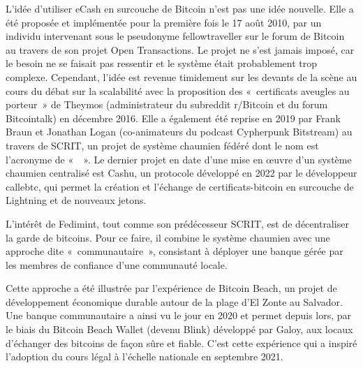 L'idée d'utiliser eCash en surcouche de Bitcoin n'est pas une idée nouvelle. Elle a été proposée et implémentée pour la première fois le 17 août 2010, par un individu intervenant sous le pseudonyme fellowtraveller sur le forum de Bitcoin au travers de son projet Open Transactions. Le projet ne s'est jamais imposé, car le besoin ne se faisait pas ressentir et le système était probablement trop complexe. Cependant, l'idée est revenue timidement sur les devants de la scène au cours du débat sur la scalabilité avec la proposition des «~certificats aveugles au porteur~» de Theymos (administrateur du subreddit r/Bitcoin et du forum Bitcointalk) en décembre 2016. Elle a également été reprise en 2019 par Frank Braun et Jonathan Logan (co-animateurs du podcast Cypherpunk Bitstream) au travers de SCRIT, un projet de système chaumien fédéré dont le nom est l'acronyme de «~~». Le dernier projet en date d'une mise en œuvre d'un système chaumien centralisé est Cashu, un protocole développé en 2022 par le développeur callebtc, qui permet la création et l'échange de certificats-bitcoin en surcouche de Lightning et de nouveaux jetons.


L'intérêt de Fedimint, tout comme son prédécesseur SCRIT, est de décentraliser la garde de bitcoins. Pour ce faire, il combine le système chaumien avec une approche dite «~communautaire~», consistant à déployer une banque gérée par les membres de confiance d'une communauté locale.

Cette approche a été illustrée par l'expérience de Bitcoin Beach, un projet de développement économique durable autour de la plage d'El Zonte au Salvador. Une banque communautaire a ainsi vu le jour en 2020 et permet depuis lors, par le biais du Bitcoin Beach Wallet (devenu Blink) développé par Galoy, aux locaux d'échanger des bitcoins de façon sûre et fiable. C'est cette expérience qui a inspiré l'adoption du cours légal à l'échelle nationale en septembre 2021.

